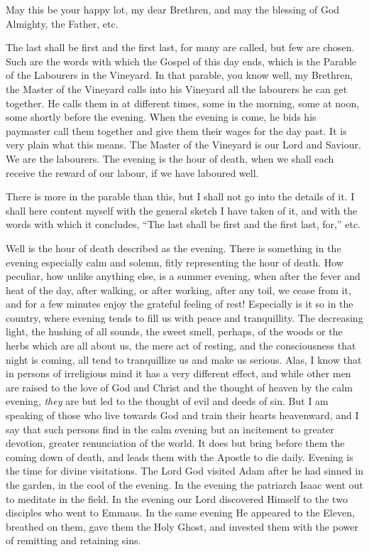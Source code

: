 May this be your happy lot, my dear Brethren, and
may the blessing of God Almighty, the Father, etc.



The last shall be first and the first last,
for many are called, but few are chosen. Such are the words with which
the Gospel of this day ends, which is the Parable of the Labourers in
the Vineyard. In that parable, you know well, my Brethren, the Master
of the Vineyard calls into his Vineyard all the labourers he can get
together. He calls them in at different times, some in the morning,
some at noon, some shortly before the evening. When the evening is
come, he bids his paymaster call them together and give them their
wages for the day past. It is very plain what this means. The Master
of the Vineyard is our Lord and Saviour. We are the labourers. The
evening is the hour of death, when we shall each receive the reward of
our labour, if we have laboured well.

There is more in the parable than this, but I
shall not go into the details of it. I shall here content myself with
the general sketch I have taken of it, and with the words with
which it concludes, ``The last shall be first and the first last,
for,'' etc.

Well is the hour of death described as the
evening. There is something in the evening especially calm and solemn,
fitly representing the hour of death. How peculiar, how unlike
anything else, is a summer evening, when after the fever and heat of
the day, after walking, or after working, after any toil, we cease
from it, and for a few minutes enjoy the grateful feeling of rest!
Especially is it so in the country, where evening tends to fill us
with peace and tranquillity. The decreasing light, the hushing of all
sounds, the sweet smell, perhaps, of the woods or the herbs which are
all about us, the mere act of resting, and the consciousness that
night is coming, all tend to tranquillize us and make us serious.
Alas, I know that in persons of irreligious mind it has a very
different effect, and while other men are raised to the love of God
and Christ and the thought of heaven by the calm evening, \emph{they}
are but led to the thought of evil and deeds of sin. But I am speaking
of those who live towards God and train their hearts heavenward, and I
say that such persons find in the calm evening but an incitement to
greater devotion, greater renunciation of the world. It does but bring
before them the coming down of death, and leads them with the Apostle
to die daily. Evening is the time for divine visitations. The Lord God
visited Adam after he had sinned in the garden, in the cool of
the evening. In the evening the patriarch Isaac went out to meditate
in the field. In the evening our Lord discovered Himself to the two
disciples who went to Emmaus. In the same evening He appeared to the
Eleven, breathed on them, gave them the Holy Ghost, and invested them
with the power of remitting and retaining sins.

